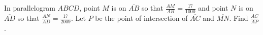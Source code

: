 In parallelogram $ ABCD$, point $ M$ is on $ \overline{AB}$ so that $ \frac{AM}{AB} = \frac{17}{1000}$ and point $ N$ is on $ \overline{AD}$ so that $ \frac{AN}{AD} = \frac{17}{2009}$. Let $ P$ be the point of intersection of $ \overline{AC}$ and $ \overline{MN}$. Find $ \frac{AC}{AP}$.